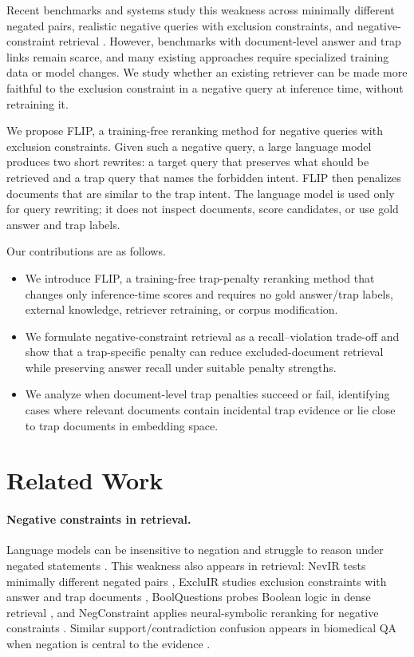 \documentclass[11pt]{article}
\newcommand{\method}{FLIP\xspace}
\begin{document}
Recent benchmarks and systems study this weakness across minimally different negated pairs, realistic negative queries with exclusion constraints, and negative-constraint retrieval \citep{weller-etal-2024-nevir, zhang2024excluir, xu-etal-2025-negconstraint}.
However, benchmarks with document-level answer and trap links remain scarce, and many existing approaches require specialized training data or model changes.
We study whether an existing retriever can be made more faithful to the exclusion constraint in a negative query at inference time, without retraining it.

We propose \method, a training-free reranking method for negative queries with exclusion constraints.
Given such a negative query, a large language model produces two short rewrites: a target query that preserves what should be retrieved and a trap query that names the forbidden intent.
\method then penalizes documents that are similar to the trap intent.
The language model is used only for query rewriting; it does not inspect documents, score candidates, or use gold answer and trap labels.

Our contributions are as follows.
\begin{itemize}
    \item We introduce \method, a training-free trap-penalty reranking method that changes only inference-time scores and requires no gold answer/trap labels, external knowledge, retriever retraining, or corpus modification.
    \item We formulate negative-constraint retrieval as a recall--violation trade-off and show that a trap-specific penalty can reduce excluded-document retrieval while preserving answer recall under suitable penalty strengths.
    \item We analyze when document-level trap penalties succeed or fail, identifying cases where relevant documents contain incidental trap evidence or lie close to trap documents in embedding space.
\end{itemize}

\section{Related Work}

\paragraph{Negative constraints in retrieval.}
Language models can be insensitive to negation and struggle to reason under negated statements \citep{truong-etal-2023-language}.
This weakness also appears in retrieval: NevIR tests minimally different negated pairs \citep{weller-etal-2024-nevir}, ExcluIR studies exclusion constraints with answer and trap documents \citep{zhang2024excluir}, BoolQuestions probes Boolean logic in dense retrieval \citep{zhang2024boolquestionsdoesdenseretrieval}, and NegConstraint applies neural-symbolic reranking for negative constraints \citep{xu-etal-2025-negconstraint}.
Similar support/contradiction confusion appears in biomedical QA when negation is central to the evidence \citep{sahoo2026negationsemanticdiagnosingdense}.
\end{document}
